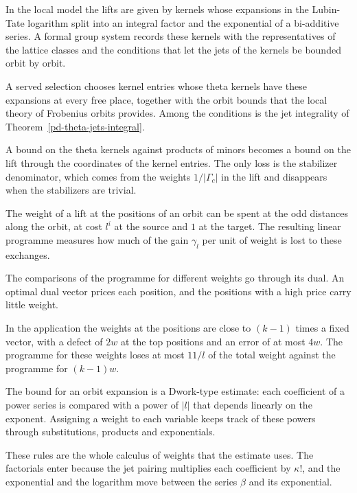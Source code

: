 In the local model the lifts are given by kernels whose expansions in the Lubin-Tate logarithm
split into an integral factor and the exponential of a bi-additive series. A formal group system
records these kernels with the representatives of the lattice classes and the conditions that let
the jets of the kernels be bounded orbit by orbit.

A served selection chooses kernel entries whose theta kernels have these expansions at every free
place, together with the orbit bounds that the local theory of Frobenius orbits provides. Among the
conditions is the jet integrality of Theorem~\ref{pd-theta-jets-integral}.

A bound on the theta kernels against products of minors becomes a bound on the lift through the
coordinates of the kernel entries. The only loss is the stabilizer denominator, which comes from the
weights $1/|\Gamma_c|$ in the lift and disappears when the stabilizers are trivial.

The weight of a lift at the positions of an orbit can be spent at the odd distances along the orbit,
at cost $l^i$ at the source and $1$ at the target. The resulting linear programme measures how much
of the gain $\gamma_l$ per unit of weight is lost to these exchanges.

The comparisons of the programme for different weights go through its dual. An optimal dual
vector prices each position, and the positions with a high price carry little weight.

In the application the weights at the positions are close to $(k-1)$ times a fixed vector, with a
defect of $2w$ at the top positions and an error of at most $4w$. The programme for these weights
loses at most $11/l$ of the total weight against the programme for $(k-1)w$.

The bound for an orbit expansion is a Dwork-type estimate: each coefficient of a power series is
compared with a power of $|l|$ that depends linearly on the exponent. Assigning a weight to each
variable keeps track of these powers through substitutions, products and exponentials.

These rules are the whole calculus of weights that the estimate uses. The factorials enter because
the jet pairing multiplies each coefficient by $\kappa!$, and the exponential and the logarithm move
between the series $\beta$ and its exponential.


